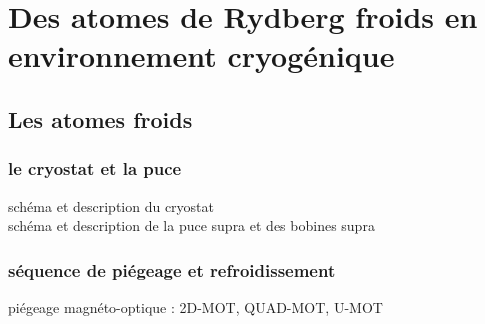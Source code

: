 %		
%		
%		
%		
%

\chapter{Des atomes de Rydberg froids en environnement cryogénique}
\label{chapter:setup_coldatoms_Rydberg}

\section{Les atomes froids}
	\subsection{le cryostat et la puce}
	\noindent schéma et description du cryostat \\
	\noindent schéma et description de la puce supra et des bobines supra
	\subsection{séquence de piégeage et refroidissement}
		\noindent piégeage magnéto-optique : 2D-MOT, QUAD-MOT, U-MOT \\
		
